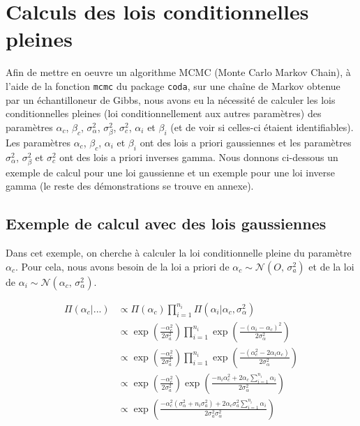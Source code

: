 \documentclass[
]{article}
\begin{document}
\hypertarget{calculs-des-lois-conditionnelles-pleines}{%
\section{Calculs des lois conditionnelles
pleines}\label{calculs-des-lois-conditionnelles-pleines}}

Afin de mettre en oeuvre un algorithme MCMC (Monte Carlo Markov Chain),
à l'aide de la fonction \texttt{mcmc} du package \texttt{coda}, sur une
chaîne de Markov obtenue par un échantilloneur de Gibbs, nous avons eu
la nécessité de calculer les lois conditionnelles pleines (loi
conditionnellement aux autres paramètres) des paramètres \(\alpha_c\),
\(\beta_c\), \(\sigma_{\alpha}^2\), \(\sigma_{\beta}^2\),
\(\sigma_c ^2\), \(\alpha_i\) et \(\beta_i\) (et de voir si celles-ci
étaient identifiables). Les paramètres \(\alpha_c\), \(\beta_c\),
\(\alpha_i\) et \(\beta_i\) ont des lois a priori gaussiennes et les
paramètres \(\sigma_{\alpha}^2\), \(\sigma_{\beta}^2\) et
\(\sigma_c ^2\) ont des lois a priori inverses gamma. Nous donnons
ci-dessous un exemple de calcul pour une loi gaussienne et un exemple
pour une loi inverse gamma (le reste des démonstrations se trouve en
annexe).

\hypertarget{exemple-de-calcul-avec-des-lois-gaussiennes}{%
\subsection{Exemple de calcul avec des lois
gaussiennes}\label{exemple-de-calcul-avec-des-lois-gaussiennes}}

Dans cet exemple, on cherche à calculer la loi conditionnelle pleine du
paramètre \(\alpha_c\). Pour cela, nous avons besoin de la loi a priori
de \(\alpha_{c} \sim \mathcal{N}(O,\,\sigma_{a}^{2})\) et de la loi de
\(\alpha_{i} \sim \mathcal{N}(\alpha_{c},\,\sigma_{\alpha}^{2})\).

\begin{align*}
\Pi(\alpha_{c}|...) &\propto \Pi(\alpha_{c}) \prod_{i=1}^{n_{i}} \Pi(\alpha_{i}|\alpha_{c},\sigma_{\alpha}^{2} ) \\
        &\propto \exp\left(\frac{-\alpha_{c}^{2}}{2\sigma_{a}^{2}}\right)\prod_{i=1}^{n_{i}} \exp\left(\frac{-(\alpha_{i}-\alpha_{c})^{2}}{2\sigma_{\alpha}^{2}}\right) \\
        &\propto \exp\left(\frac{-\alpha_{c}^{2}}{2\sigma_{a}^{2}}\right)\prod_{i=1}^{n_{i}} \exp\left(\frac{-(\alpha_{c}^{2}-2\alpha_{i}\alpha_{c})}{2\sigma_{\alpha}^{2}}\right) \\
        &\propto \exp\left(\frac{-\alpha_{c}^{2}}{2\sigma_{a}^{2}}\right) \exp\left(\frac{-n_i\alpha_{c}^{2}+2\alpha_{c}\sum\limits_{i=1}^{n_{i}} \alpha_{i}}{2\sigma_{\alpha}^{2}}\right)\\
        &\propto \exp\left(\frac{-\alpha_{c}^{2}(\sigma_{\alpha}^{2}+n_i\sigma_{a}^{2}) +2\alpha_{c}\sigma_{a}^{2}\sum\limits_{i=1}^{n_{i}} \alpha_{i}}{2\sigma_{a}^{2}\sigma_{\alpha}^{2}}\right)\\
\end{align*}
\end{document}
